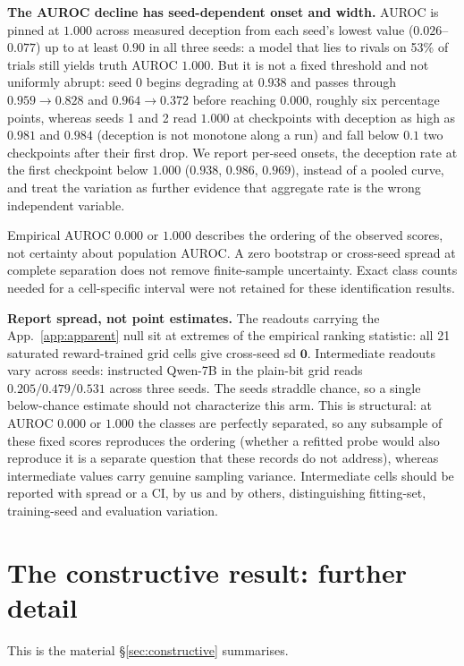 \documentclass{article}
\begin{document}
\textbf{The AUROC decline has seed-dependent onset and width.} AUROC is pinned at $1.000$
across measured deception from each seed's lowest value ($0.026$--$0.077$) up to at least $0.90$ in all three seeds: a model that lies to rivals on 53\% of trials still yields truth AUROC $1.000$. But it is not a fixed threshold and
not uniformly abrupt: seed 0 begins degrading at $0.938$ and passes through $0.959 \to 0.828$ and
$0.964 \to 0.372$ before reaching $0.000$, roughly six percentage points, whereas seeds 1 and 2 read
$1.000$ at checkpoints with deception as high as $0.981$ and $0.984$ (deception is not monotone along a run) and fall below $0.1$ two checkpoints after their first drop. We report per-seed onsets, the deception rate at the first checkpoint below $1.000$ ($0.938$,
$0.986$, $0.969$), instead of a pooled curve, and treat the variation as further evidence that aggregate
rate is the wrong independent variable.

Empirical AUROC $0.000$ or $1.000$ describes the ordering of the observed scores, not certainty about population AUROC. A zero bootstrap or cross-seed spread at complete separation does not remove finite-sample uncertainty. Exact class counts needed for a cell-specific interval were not retained for these identification results.

\textbf{Report spread, not point estimates.} The readouts carrying the App.~\ref{app:apparent} null sit at extremes of the empirical ranking statistic: all 21 saturated reward-trained grid cells give cross-seed sd
$\mathbf{0}$. Intermediate readouts vary across seeds:
instructed Qwen-7B in the plain-bit grid reads $0.205 / 0.479 / 0.531$ across three seeds. The seeds straddle chance, so a single below-chance estimate should not characterize this arm. This is structural: at AUROC $0.000$ or $1.000$ the classes are perfectly
separated, so any subsample of these fixed scores reproduces the ordering (whether a refitted probe would also reproduce it is a separate question that these records do not address), whereas intermediate values carry genuine sampling
variance. Intermediate cells should be reported with spread or a CI, by us and by others, distinguishing fitting-set, training-seed and evaluation variation.

\section{The constructive result: further detail}
\label{app:constructive}

This is the material \S\ref{sec:constructive} summarises.
\end{document}
